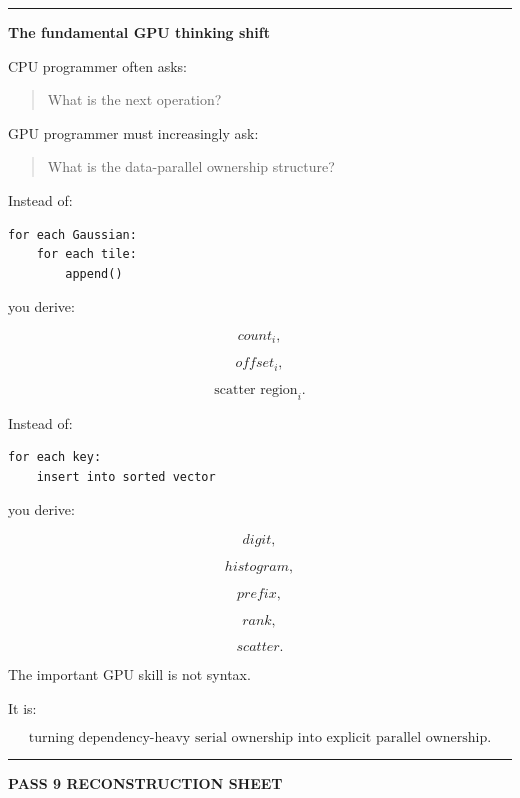 \begin{center}\rule{0.5\linewidth}{0.5pt}\end{center}

\textbf{The fundamental GPU thinking shift}

CPU programmer often asks:

\begin{quote}
What is the next operation?
\end{quote}

GPU programmer must increasingly ask:

\begin{quote}
What is the data-parallel ownership structure?
\end{quote}

Instead of:

\protect{}\label{yllozt}%
\begin{verbatim}
for each Gaussian:
    for each tile:
        append()
\end{verbatim}

you derive:

\[
count_i,
\]

\[
offset_i,
\]

\[
\text{scatter region}_i.
\]

Instead of:

\protect{}\label{qfd2y3}%
\begin{verbatim}
for each key:
    insert into sorted vector
\end{verbatim}

you derive:

\[
digit,
\]

\[
histogram,
\]

\[
prefix,
\]

\[
rank,
\]

\[
scatter.
\]

The important GPU skill is not syntax.

It is:

\[
\boxed{
\text{turning dependency-heavy serial ownership into explicit parallel ownership}.
}
\]

\begin{center}\rule{0.5\linewidth}{0.5pt}\end{center}

\textbf{PASS 9 RECONSTRUCTION SHEET}

